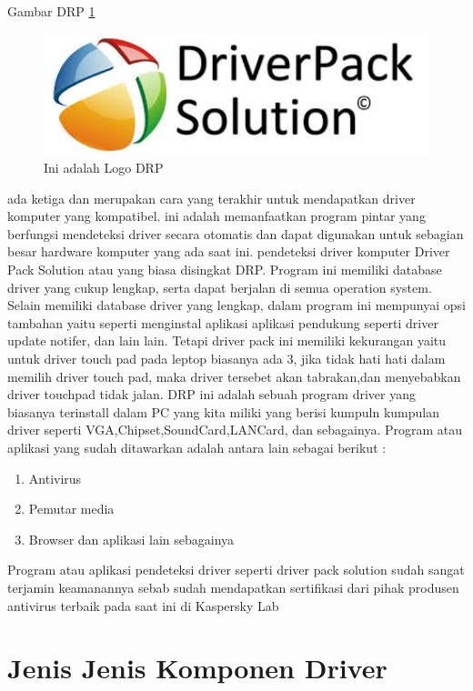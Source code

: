 Gambar DRP \ref{drp}

  \begin{figure}[ht]
  \centerline{\includegraphics[width=1\textwidth]{../figures/drp.jpg}}
  \caption{Ini adalah Logo DRP}
  \label{drp}
  \end{figure}

ada ketiga dan merupakan cara yang terakhir untuk mendapatkan driver komputer yang kompatibel.
ini adalah memanfaatkan program pintar yang berfungsi mendeteksi driver secara otomatis dan dapat digunakan untuk sebagian besar hardware komputer yang ada saat ini.
pendeteksi driver komputer  Driver Pack Solution atau yang biasa disingkat DRP.
Program ini memiliki database driver yang cukup lengkap, serta dapat berjalan di semua operation system.
Selain memiliki database driver yang lengkap, dalam program ini mempunyai opsi tambahan yaitu seperti menginstal aplikasi aplikasi pendukung seperti driver update notifer, dan lain lain.
Tetapi driver pack ini memiliki kekurangan yaitu untuk driver touch pad pada leptop biasanya ada 3, jika tidak hati hati dalam memilih driver touch pad, maka driver tersebet akan tabrakan,dan menyebabkan driver touchpad tidak jalan.
DRP ini adalah sebuah program driver yang biasanya terinstall dalam PC yang kita miliki yang berisi kumpuln kumpulan driver seperti VGA,Chipset,SoundCard,LANCard, dan sebagainya.
Program atau aplikasi  yang sudah ditawarkan adalah antara lain sebagai berikut :
\begin{enumerate}
\item Antivirus 
\item Pemutar media
\item Browser dan aplikasi lain sebagainya 
\end{enumerate}
Program atau aplikasi pendeteksi driver seperti driver pack solution sudah sangat terjamin keamanannya sebab sudah mendapatkan sertifikasi dari pihak produsen antivirus terbaik pada saat ini di Kaspersky Lab

\section{Jenis Jenis Komponen Driver}

